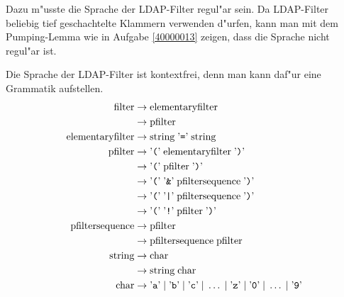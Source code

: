 \begin{loesung}
\begin{teilaufgaben}
\item
Dazu m"usste die Sprache der LDAP-Filter regul"ar sein.
Da LDAP-Filter beliebig tief geschachtelte Klammern verwenden d"urfen,
kann man mit dem Pumping-Lemma wie in Aufgabe \ref{40000013} zeigen,
dass die Sprache nicht regul"ar ist.
\item
Die Sprache der LDAP-Filter ist kontextfrei, denn man kann daf"ur
eine Grammatik aufstellen.
\begin{align*}
\text{filter}
        &\rightarrow\text{elementaryfilter}\\
        &\rightarrow\text{pfilter}\\
\text{elementaryfilter}
        &\rightarrow \text{string} \;\text{'{\tt =}'}\; \text{string}\\
\text{pfilter}
        &\rightarrow \text{'{\tt (}'}\;\text{elementaryfilter}\;\text{'{\tt )}'} \\
        &\rightarrow \text{'{\tt (}'}\;\text{pfilter}\;\text{'{\tt )}'} \\
        &\rightarrow \text{'{\tt (}'}\; \text{'{\tt \&}'}\;
                \text{pfiltersequence}\;\text{'{\tt )}'} \\
        &\rightarrow \text{'{\tt (}'}\; \text{'{\tt |}'}\;
                \text{pfiltersequence}\;\text{'{\tt )}'} \\
        &\rightarrow \text{'{\tt (}'}\; \text{'{\tt !}'}\;
                \text{pfilter}\;\text{'{\tt )}'} \\
\text{pfiltersequence}
        &\rightarrow \text{pfilter}\\
        &\rightarrow \text{pfiltersequence}\;\text{pfilter}\\
\text{string}
        &\rightarrow \text{char}\\
        &\rightarrow \text{string} \; \text{char}\\
\text{char}
        &\rightarrow
\text{'{\tt a}'}\;|\;
\text{'{\tt b}'}\;|\;
\text{'{\tt c}'}\;|\;\dots\;|\;
\text{'{\tt z}'}\;|\;
\text{'{\tt 0}'}\;|\;\dots\;|\;
\text{'{\tt 9}'}
\end{align*}
\end{teilaufgaben}
\end{loesung}
